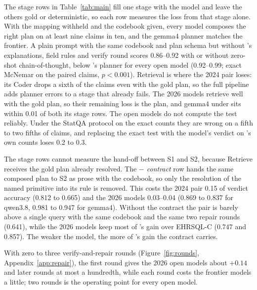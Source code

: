The stage rows in Table~\ref{tab:main} fill one stage with the model and leave the others gold or
deterministic, so each row measures the loss from that stage
alone. With the mapping withheld and the codebook given, every model
composes the right plan on at least nine claims in ten, and the gemma4
planner matches the frontier. A plain prompt with the same codebook and plan
schema but without \art{}'s explanations, field rules and verify round
scores 0.86--0.92 with or without zero-shot chain-of-thought, below
\art{}'s planner for every open model (0.92--0.99; exact McNemar on the
paired claims, $p < 0.001$). Retrieval is where the 2024 pair loses: its
Coder drops a sixth of the claims even with the gold plan, so the full
pipeline adds planner errors to a stage that already fails. The 2026 models
retrieve well with the gold plan, so their remaining loss is the plan, and
gemma4 under \art{} sits within 0.01 of both its stage rows. The open models
do not compute the test reliably. Under the StatQA protocol on the exact
counts they are wrong on a fifth to two fifths of claims, and replacing the
exact test with the model's verdict on \art{}'s own counts loses 0.2 to
0.3.

The stage rows cannot measure the hand-off between S1 and S2, because
Retrieve receives the gold plan already resolved. The \emph{$-$ contract}
row hands the same composed plan to S2 as prose with the codebook, so only
the resolution of the named primitive into its rule is removed. This costs the 2024 pair 0.15 of
verdict accuracy (0.812 to 0.665) and the 2026 models 0.03--0.04 (0.869 to
0.837 for qwen3.8, 0.981 to 0.947 for gemma4). Without the contract the pair is
barely above a single query with the same codebook and the same two repair
rounds (0.641), while the 2026 models keep most of \art{}'s gain over
EHRSQL-C (0.747 and 0.857). The weaker the model, the more of \art{}'s gain
the contract carries.

With zero to three verify-and-repair rounds (Figure~\ref{fig:rounds},
Appendix~\ref{app:repair}), the first round gives the 2026 open models about
$+0.14$ and later rounds at most a hundredth, while each round costs the
frontier models a little; two rounds is the operating point for every open
model.

